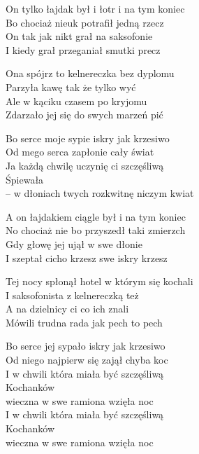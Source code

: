 \begin{text}
    On tylko łajdak był i łotr i na tym koniec\\
    Bo chociaż nieuk potrafił jedną rzecz\\
    On tak jak nikt grał na saksofonie\\
    I kiedy grał przeganiał smutki precz

    Ona spójrz to kelnereczka bez dyplomu\\
    Parzyła kawę tak że tylko wyć\\
    Ale w kąciku czasem po kryjomu\\
    Zdarzało jej się do swych marzeń pić

    Bo serce moje sypie iskry jak krzesiwo\\
    Od mego serca zapłonie cały świat\\
    Ja każdą chwilę uczynię ci szczęśliwą\\
    Śpiewała\\
    – w dłoniach twych rozkwitnę niczym kwiat

    A on łajdakiem ciągle był i na tym koniec\\
    No chociaż nie bo przyszedł taki zmierzch\\
    Gdy głowę jej ujął w swe dłonie\\
    I szeptał cicho krzesz swe iskry krzesz

    Tej nocy spłonął hotel w którym się kochali\\
    I saksofonista z kelnereczką też\\
    A na dzielnicy ci co ich znali\\
    Mówili trudna rada jak pech to pech

    Bo serce jej sypało iskry jak krzesiwo\\
    Od niego najpierw się zajął chyba koc\\
    I w chwili która miała być szczęśliwą\\
    Kochanków\\
    wieczna w swe ramiona wzięła noc\\
    I w chwili która miała być szczęśliwą\\
    Kochanków\\
    wieczna w swe ramiona wzięła noc
\end{text}
\begin{chord}

\end{chord}